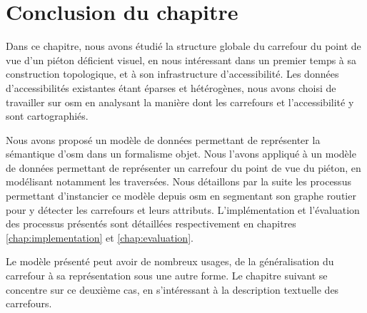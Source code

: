 \section{Conclusion du chapitre}

Dans ce chapitre, nous avons étudié la structure globale du carrefour du point de vue d'un piéton déficient visuel, en nous intéressant dans un premier temps à sa construction topologique, et à son infrastructure d'accessibilité. Les données d'accessibilités existantes étant éparses et hétérogènes, nous avons choisi de travailler sur \gls{osm} en analysant la manière dont les carrefours et l'accessibilité y sont cartographiés.

\newpar{}

Nous avons proposé un modèle de données permettant de représenter la sémantique d'\gls{osm} dans un formalisme objet. Nous l'avons appliqué à un modèle de données permettant de représenter un carrefour du point de vue du piéton, en modélisant notamment les traversées. Nous détaillons par la suite les processus permettant d'instancier ce modèle depuis \gls{osm} en segmentant son graphe routier pour y détecter les carrefours et leurs attributs. L'implémentation et l'évaluation des processus présentés sont détaillées respectivement en chapitres \ref{chap:implementation} et \ref{chap:evaluation}.

\newpar{}

Le modèle présenté peut avoir de nombreux usages, de la généralisation du carrefour à sa représentation sous une autre forme. Le chapitre suivant se concentre sur ce deuxième cas, en s'intéressant à la description textuelle des carrefours.